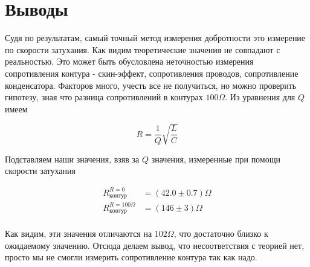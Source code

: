 \documentclass{article}
\begin{document}
\newpage
\section{Выводы}\label{vivodi}
Судя по результатам, самый точный метод измерения добротности это измерение по скорости
затухания. Как видим теоретические значения не совпадают с реальностью. Это может
быть обусловлена неточностью измерения сопротивления контура - скин-эффект, сопротивления
проводов, сопротивление конденсатора. Факторов много, учесть все не получиться, но можно
проверить гипотезу, зная что разница сопротивлений в контурах $100\Omega$. Из уравнения
для $Q$ имеем

\begin{equation}
    R = \frac{1}{Q} \sqrt{\frac{L}{C}}
\end{equation}

Подставляем наши значения, взяв за $Q$ значения, измеренные при помощи скорости затухания

\begin{equation}
    \begin{aligned}
        R_{контур}^{R=0} &= (42.0 \pm 0.7) \Omega \\
        R_{контур}^{R=100\Omega} &= (146 \pm 3) \Omega \\
    \end{aligned}
\end{equation}

Как видим, эти значения отличаются на $102\Omega$, что достаточно близко к ожидаемому
значению. Отсюда делаем вывод, что несоответствия с теорией нет, просто мы не смогли
измерить сопротивление контура так как надо.
\end{document}
